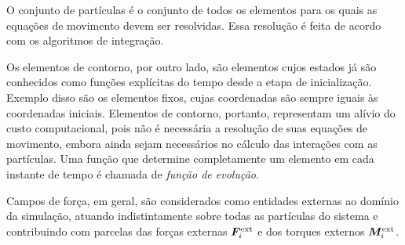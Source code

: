 O conjunto de partículas é o conjunto de todos os elementos para os quais as equações de movimento devem ser resolvidas. Essa resolução é feita de acordo com os algoritmos de integração. 

Os elementos de contorno, por outro lado, são elementos cujos estados já são conhecidos como funções explícitas do tempo desde a etapa de inicialização. Exemplo disso são os elementos fixos, cujas coordenadas são sempre iguais às coordenadas iniciais. Elementos de contorno, portanto, representam um alívio do custo computacional, pois não é necessária a resolução de suas equações de movimento, embora ainda sejam necessários no cálculo das interações com as partículas. Uma função que determine completamente um elemento em cada instante de tempo é chamada de \textit{função de evolução}.

Campos de força, em geral, são considerados como entidades externas ao domínio da simulação, atuando indistintamente sobre todas as partículas do sistema e contribuindo com parcelas das forças externas \(\bm{F}_{i}^{\text{ext}}\) e dos torques externos \(\bm{M}_{i}^{\text{ext}}\).

